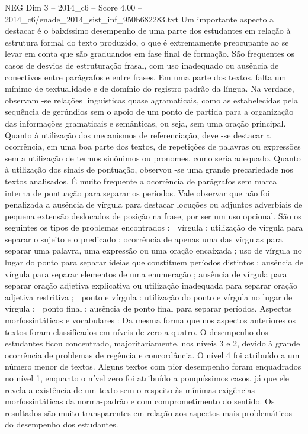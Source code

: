 \begin{textsample}{NEG Dim 3 – 2014\_c6 – Score 4.00 – 2014\_c6/enade\_2014\_sist\_inf\_950b682283.txt}
Um importante aspecto a destacar é o baixíssimo desempenho de uma parte dos estudantes em relação à estrutura formal do texto produzido, o que é extremamente preocupante ao se levar em conta que são graduandos em fase final de formação.
São frequentes os casos de desvios de estruturação frasal, com uso inadequado ou ausência de conectivos entre parágrafos e entre frases.
Em uma parte dos textos, falta um mínimo de textualidade e de domínio do registro padrão da língua.
Na verdade, observam -se relações linguísticas quase agramaticais, como as estabelecidas pela sequência de gerúndios sem o apoio de um ponto de partida para a organização das informações gramaticais e semânticas, ou seja, sem uma oração principal.
Quanto à utilização dos mecanismos de referenciação, deve -se destacar a ocorrência, em uma boa parte dos textos, de repetições de palavras ou expressões sem a utilização de termos sinônimos ou pronomes, como seria adequado.
Quanto à utilização dos sinais de pontuação, observou -se uma grande precariedade nos textos analisados.
É muito frequente a ocorrência de parágrafos sem marca interna de pontuação para separar os períodos.
Vale observar que não foi penalizada a ausência de vírgula para destacar locuções ou adjuntos adverbiais de pequena extensão deslocados de posição na frase, por ser um uso opcional.
São os seguintes os tipos de problemas encontrados :  vírgula : utilização de vírgula para separar o sujeito e o predicado ; ocorrência de apenas uma das vírgulas para separar uma palavra, uma expressão ou uma oração encaixada ; uso de vírgula no lugar do ponto para separar ideias que constituem períodos distintos ; ausência de vírgula para separar elementos de uma enumeração ; ausência de vírgula para separar oração adjetiva explicativa ou utilização inadequada para separar oração adjetiva restritiva ;  ponto e vírgula : utilização do ponto e vírgula no lugar de vírgula ;  ponto final : ausência de ponto final para separar períodos.
Aspectos morfossintáticos e vocabulares : Da mesma forma que nos aspectos anteriores os textos foram classificados em níveis de zero a quatro.
O desempenho dos estudantes ficou concentrado, majoritariamente, nos níveis 3 e 2, devido à grande ocorrência de problemas de regência e concordância.
O nível 4 foi atribuído a um número menor de textos.
Alguns textos com pior desempenho foram enquadrados no nível 1, enquanto o nível zero foi atribuído a pouquíssimos casos, já que ele revela a existência de um texto sem o respeito às mínimas exigências morfossintáticas da norma-padrão e com comprometimento do sentido.
Os resultados são muito transparentes em relação aos aspectos mais problemáticos do desempenho dos estudantes.

\end{textsample}
